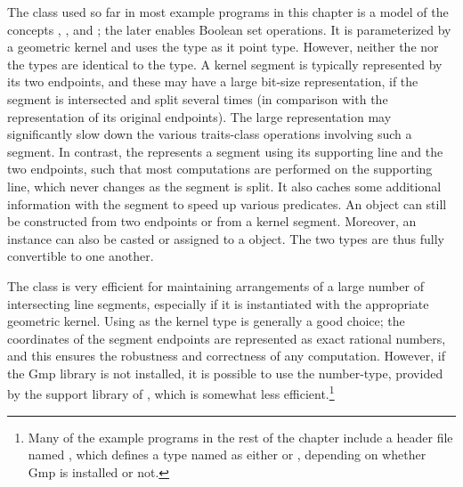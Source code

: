 The  class used so far in most
example programs in this chapter is a model of the concepts
, ,
and ; the later
enables Boolean set operations. It is parameterized by a
geometric kernel and uses the  type as it
point type. However, neither the  nor the
 types are identical to the
 type. A kernel segment is typically
represented by its two endpoints, and these may have a large bit-size
representation, if the segment is intersected and split several
times (in comparison with the representation of its original
endpoints). The large representation may significantly slow down the
various traits-class operations involving such a segment. In contrast,
the  represents a segment using
its supporting line and the two endpoints, such that most computations
are performed on the supporting line, which never changes as the
segment is split. It also caches some additional information with
the segment to speed up various predicates.
An  object can still be constructed from two
endpoints or from a kernel segment. Moreover, an
 instance can also be casted or assigned to a
 object. The two types are thus fully
convertible to one another.

The  class is very efficient for
maintaining arrangements of a large number of intersecting line
segments, especially if it is instantiated with the appropriate
geometric kernel. Using  as the kernel type is
generally a good choice; the coordinates of the segment endpoints are
represented as exact rational numbers, and this ensures the robustness
and correctness of any computation. However, if the {\sc Gmp}
library is not installed, it is possible to use the
 number-type, provided by the support library
of \cgal, which is somewhat less efficient.\footnote{Many of the
example programs in the rest of the chapter include a header file
named , which defines a type named
 as either  or ,
depending on whether {\sc Gmp} is installed or not.}

